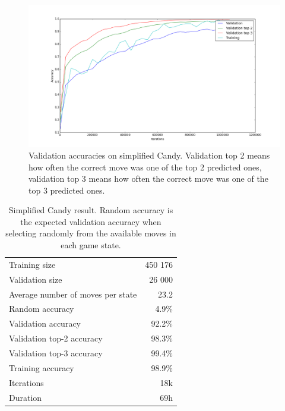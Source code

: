\documentclass{kththesis}
\begin{document}
\begin{figure}[!htb]
\centering
\includegraphics[width=\textwidth]{images/candy_small_validation.png}
\caption{Validation accuracies on simplified Candy. Validation top 2 means how often the correct move was one of the top 2 predicted ones, validation top 3 means how often the correct move was one of the top 3 predicted ones.}
\label{fig:candy_small_validation_accuracy}
\end{figure}



\begin{table}
\caption{Simplified Candy result. Random accuracy is the expected validation accuracy when selecting randomly from the available moves in each game state.}
\centering
\begin{tabular}{ l | r }
\hline
Training size & 450 176\\
Validation size & 26 000\\
Average number of moves per state & 23.2 \\
Random accuracy & 4.9\% \\
Validation accuracy & 92.2\% \\
Validation top-2 accuracy & 98.3\% \\
Validation top-3 accuracy & 99.4\% \\
Training accuracy & 98.9\% \\
Iterations & 18k \\
Duration & 69h \\
\hline
\end{tabular}
\end{table}
\end{document}
